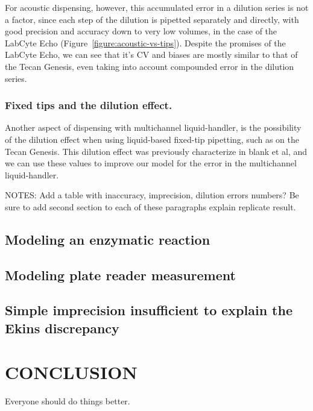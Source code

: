 \documentclass[aps,pre,twocolumn,nofootinbib,superscriptaddress,linenumbers]{revtex4-1}
\begin{document}
For acoustic dispensing, however, this accumulated error in a dilution series is not a factor, since each step of the dilution is pipetted separately and directly, with good precision and accuracy down to very low volumes, in the case of the LabCyte Echo (Figure~\ref{figure:acoustic-vs-tips}). Despite the promises of the LabCyte Echo, we can see that it's CV and biases are mostly similar to that of the Tecan Genesis, even taking into account compounded error in the dilution series.

\subsubsection*{Fixed tips and the dilution effect.}

Another aspect of dispensing with multichannel liquid-handler, is the possibility of the dilution effect when using liquid-based fixed-tip pipetting, such as on the Tecan Genesis. This dilution effect was previously characterize in blank et al, and we can use these values to improve our model for the error in the multichannel liquid-handler.

NOTES:
Add a table with inaccuracy, imprecision, dilution errors numbers?
Be sure to add second section to each of these paragraphs explain replicate result.

\subsection*{Modeling an enzymatic reaction}

\subsection*{Modeling plate reader measurement}

\subsection*{Simple imprecision insufficient to explain the Ekins discrepancy}


\section{CONCLUSION}

Everyone should do things better.
\end{document}
